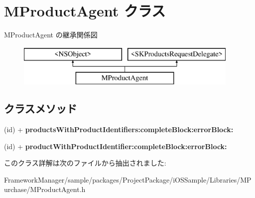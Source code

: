 \hypertarget{interface_m_product_agent}{}\section{M\+Product\+Agent クラス}
\label{interface_m_product_agent}
M\+Product\+Agent の継承関係図\begin{figure}[H]
\begin{center}
\leavevmode
\includegraphics[height=2.000000cm]{interface_m_product_agent}
\end{center}
\end{figure}
\subsection*{クラスメソッド}
\begin{DoxyCompactItemize}
\item 
\hypertarget{interface_m_product_agent_ac246f06a119b08b9ecd5d68ac2cb9a0a}{}(id) + {\bfseries products\+With\+Product\+Identifiers\+:complete\+Block\+:error\+Block\+:}\label{interface_m_product_agent_ac246f06a119b08b9ecd5d68ac2cb9a0a}

\item 
\hypertarget{interface_m_product_agent_a363af1e89fbceb78dbd993e8d3ad3bcd}{}(id) + {\bfseries product\+With\+Product\+Identifier\+:complete\+Block\+:error\+Block\+:}\label{interface_m_product_agent_a363af1e89fbceb78dbd993e8d3ad3bcd}

\end{DoxyCompactItemize}


このクラス詳解は次のファイルから抽出されました\+:\begin{DoxyCompactItemize}
\item 
Framework\+Manager/sample/packages/\+Project\+Package/i\+O\+S\+Sample/\+Libraries/\+M\+Purchase/M\+Product\+Agent.\+h\end{DoxyCompactItemize}
